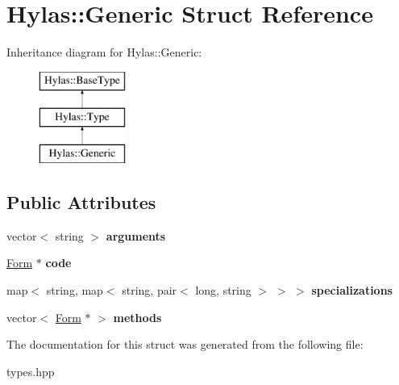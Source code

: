 \hypertarget{structHylas_1_1Generic}{
\section{Hylas::Generic Struct Reference}
\label{structHylas_1_1Generic}
}
Inheritance diagram for Hylas::Generic:\begin{figure}[H]
\begin{center}
\leavevmode
\includegraphics[height=3.000000cm]{structHylas_1_1Generic}
\end{center}
\end{figure}
\subsection*{Public Attributes}
\begin{DoxyCompactItemize}
\item 
\hypertarget{structHylas_1_1Generic_a9bd83e850da209025f98774a70b852aa}{
vector$<$ string $>$ {\bfseries arguments}}
\label{structHylas_1_1Generic_a9bd83e850da209025f98774a70b852aa}

\item 
\hypertarget{structHylas_1_1Generic_a5484587d04ff1b1d45f1efa755d904ce}{
\hyperlink{structHylas_1_1Form}{Form} $\ast$ {\bfseries code}}
\label{structHylas_1_1Generic_a5484587d04ff1b1d45f1efa755d904ce}

\item 
\hypertarget{structHylas_1_1Generic_a27d274c995fd29906050544309b083c2}{
map$<$ string, map$<$ string, pair$<$ long, string $>$ $>$ $>$ {\bfseries specializations}}
\label{structHylas_1_1Generic_a27d274c995fd29906050544309b083c2}

\item 
\hypertarget{structHylas_1_1Generic_ae8ceb9857d624ca16df1529763b69fd4}{
vector$<$ \hyperlink{structHylas_1_1Form}{Form} $\ast$ $>$ {\bfseries methods}}
\label{structHylas_1_1Generic_ae8ceb9857d624ca16df1529763b69fd4}

\end{DoxyCompactItemize}


The documentation for this struct was generated from the following file:\begin{DoxyCompactItemize}
\item 
types.hpp\end{DoxyCompactItemize}

